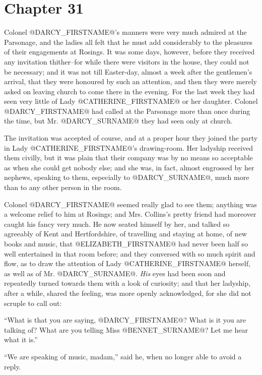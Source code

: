 \chapter*{Chapter 31}


Colonel @DARCY_FIRSTNAME@'s manners were very much admired at the Parsonage,
and the ladies all felt that he must add considerably to the pleasures
of their engagements at Rosings. It was some days, however, before they
received any invitation thither--for while there were visitors in the
house, they could not be necessary; and it was not till Easter-day,
almost a week after the gentlemen's arrival, that they were honoured by
such an attention, and then they were merely asked on leaving church to
come there in the evening. For the last week they had seen very little
of Lady @CATHERINE_FIRSTNAME@ or her daughter. Colonel @DARCY_FIRSTNAME@ had called at the
Parsonage more than once during the time, but Mr. @DARCY_SURNAME@ they had seen
only at church.

The invitation was accepted of course, and at a proper hour they joined
the party in Lady @CATHERINE_FIRSTNAME@'s drawing-room. Her ladyship received
them civilly, but it was plain that their company was by no means so
acceptable as when she could get nobody else; and she was, in fact,
almost engrossed by her nephews, speaking to them, especially to @DARCY_SURNAME@,
much more than to any other person in the room.

Colonel @DARCY_FIRSTNAME@ seemed really glad to see them; anything was a
welcome relief to him at Rosings; and Mrs. Collins's pretty friend had
moreover caught his fancy very much. He now seated himself by her, and
talked so agreeably of Kent and Hertfordshire, of travelling and staying
at home, of new books and music, that @ELIZABETH_FIRSTNAME@ had never been half so
well entertained in that room before; and they conversed with so much
spirit and flow, as to draw the attention of Lady @CATHERINE_FIRSTNAME@ herself,
as well as of Mr. @DARCY_SURNAME@. \textit{His} eyes had been soon and repeatedly turned
towards them with a look of curiosity; and that her ladyship, after a
while, shared the feeling, was more openly acknowledged, for she did not
scruple to call out:

``What is that you are saying, @DARCY_FIRSTNAME@? What is it you are talking
of? What are you telling Miss @BENNET_SURNAME@? Let me hear what it is.''

``We are speaking of music, madam,'' said he, when no longer able to avoid
a reply.


